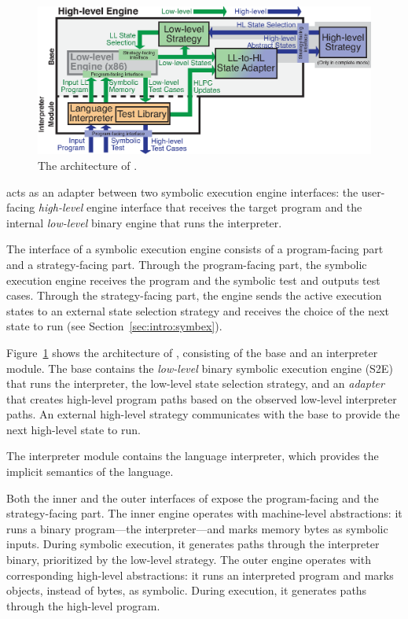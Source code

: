 \begin{figure}
  \centering
  \includegraphics[width=1.0\textwidth]{chef/figures/iface-adapter}
  \caption{The architecture of \chef.}
  \label{fig:chef:arch}
\end{figure}

\chef acts as an adapter between two symbolic execution engine interfaces:
%
the user-facing \emph{high-level} engine interface that receives the target program and the internal \emph{low-level} binary engine that runs the interpreter.

The interface of a symbolic execution engine consists of a program-facing part and a strategy-facing part.
%
Through the program-facing part, the symbolic execution engine receives the program and the symbolic test and outputs test cases.
%
Through the strategy-facing part, the engine sends the active execution states to an external state selection strategy and receives the choice of the next state to run (see Section~\ref{sec:intro:symbex}).


Figure~\ref{fig:chef:arch} shows the architecture of \chef, consisting of the base and an interpreter module.
%
The base contains the \emph{low-level} binary symbolic execution engine (S2E) that runs the interpreter, the low-level state selection strategy, and an \emph{adapter} that creates high-level program paths based on the observed low-level interpreter paths.
%
An external high-level strategy communicates with the base to provide the next high-level state to run.

The interpreter module contains the language interpreter, which provides the implicit semantics of the language.

Both the inner and the outer interfaces of \chef expose the program-facing and the strategy-facing part.
%
The inner engine operates with machine-level abstractions: it runs a binary program---the interpreter---and marks memory bytes as symbolic inputs.  During symbolic execution, it generates paths through the interpreter binary, prioritized by the low-level strategy.
%
The outer engine operates with corresponding high-level abstractions: it runs an interpreted program and marks objects, instead of bytes, as symbolic.  During execution, it generates paths through the high-level program.

